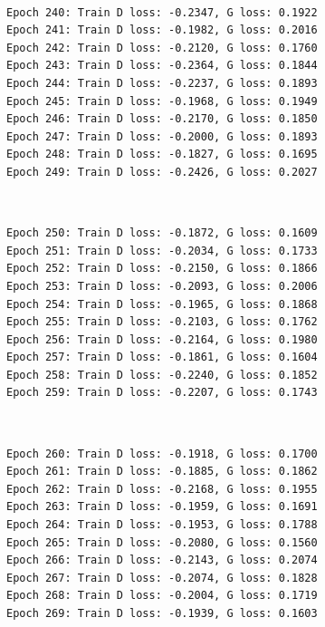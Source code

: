 \documentclass[11pt]{article}
\begin{document}
    \begin{center}
    \end{center}
    { \hspace*{\fill} \\}
    
    \begin{Verbatim}[commandchars=\\\{\}]
Epoch 240: Train D loss: -0.2347, G loss: 0.1922
Epoch 241: Train D loss: -0.1982, G loss: 0.2016
Epoch 242: Train D loss: -0.2120, G loss: 0.1760
Epoch 243: Train D loss: -0.2364, G loss: 0.1844
Epoch 244: Train D loss: -0.2237, G loss: 0.1893
Epoch 245: Train D loss: -0.1968, G loss: 0.1949
Epoch 246: Train D loss: -0.2170, G loss: 0.1850
Epoch 247: Train D loss: -0.2000, G loss: 0.1893
Epoch 248: Train D loss: -0.1827, G loss: 0.1695
Epoch 249: Train D loss: -0.2426, G loss: 0.2027

    \end{Verbatim}

    \begin{center}
    \end{center}
    { \hspace*{\fill} \\}
    
    \begin{Verbatim}[commandchars=\\\{\}]
Epoch 250: Train D loss: -0.1872, G loss: 0.1609
Epoch 251: Train D loss: -0.2034, G loss: 0.1733
Epoch 252: Train D loss: -0.2150, G loss: 0.1866
Epoch 253: Train D loss: -0.2093, G loss: 0.2006
Epoch 254: Train D loss: -0.1965, G loss: 0.1868
Epoch 255: Train D loss: -0.2103, G loss: 0.1762
Epoch 256: Train D loss: -0.2164, G loss: 0.1980
Epoch 257: Train D loss: -0.1861, G loss: 0.1604
Epoch 258: Train D loss: -0.2240, G loss: 0.1852
Epoch 259: Train D loss: -0.2207, G loss: 0.1743

    \end{Verbatim}

    \begin{center}
    \end{center}
    { \hspace*{\fill} \\}
    
    \begin{Verbatim}[commandchars=\\\{\}]
Epoch 260: Train D loss: -0.1918, G loss: 0.1700
Epoch 261: Train D loss: -0.1885, G loss: 0.1862
Epoch 262: Train D loss: -0.2168, G loss: 0.1955
Epoch 263: Train D loss: -0.1959, G loss: 0.1691
Epoch 264: Train D loss: -0.1953, G loss: 0.1788
Epoch 265: Train D loss: -0.2080, G loss: 0.1560
Epoch 266: Train D loss: -0.2143, G loss: 0.2074
Epoch 267: Train D loss: -0.2074, G loss: 0.1828
Epoch 268: Train D loss: -0.2004, G loss: 0.1719
Epoch 269: Train D loss: -0.1939, G loss: 0.1603

    \end{Verbatim}
\end{document}
